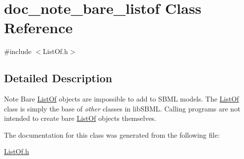 \hypertarget{classdoc__note__bare__listof}{}\section{doc\+\_\+note\+\_\+bare\+\_\+listof Class Reference}
\label{classdoc__note__bare__listof}


{\ttfamily \#include $<$List\+Of.\+h$>$}



\subsection{Detailed Description}
\begin{DoxyNote}{Note}
Bare \hyperlink{class_list_of}{List\+Of} objects are impossible to add to S\+B\+ML models. The \hyperlink{class_list_of}{List\+Of} class is simply the base of {\itshape other} classes in lib\+S\+B\+ML. Calling programs are not intended to create bare \hyperlink{class_list_of}{List\+Of} objects themselves. 
\end{DoxyNote}


The documentation for this class was generated from the following file\+:\begin{DoxyCompactItemize}
\item 
\hyperlink{_list_of_8h}{List\+Of.\+h}\end{DoxyCompactItemize}
